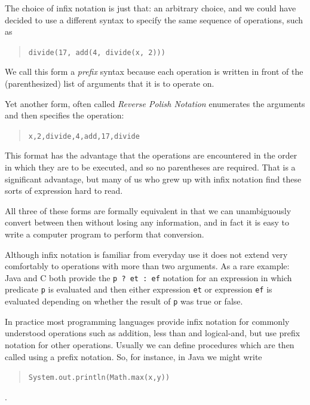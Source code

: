 The choice of infix notation is just that: an arbitrary choice, and we could have decided to use a different syntax to specify the same sequence of operations, such as \begin{quote}\begin{center}
\verb+divide(17, add(4, divide(x, 2)))+
\end{center}
\end{quote} We call this form a {\em prefix} syntax because each operation is written in front of the (parenthesized) list of arguments that it is to operate on.

Yet another form, often called {\em Reverse Polish Notation} enumerates the arguments and then specifies the operation:
\begin{quote}
\begin{center}
\verb+x,2,divide,4,add,17,divide+
\end{center}
\end{quote}

This format has the advantage that the operations are encountered in the order in which they are to be executed, and so no parentheses are required. That is a significant advantage, but many of us who grew up with infix notation find these sorts of expression hard to read.

All three of these forms are formally equivalent in that we can unambiguously convert between then without losing any information, and in fact it is easy to write a computer program to perform that conversion.

Although infix notation is familiar from everyday use it does not extend very comfortably to operations with more than two arguments. As a rare example: Java and C both provide the \verb+p ? et : ef+ notation for an expression in which predicate \verb+p+ is evaluated and then either expression \verb+et+ or expression \verb+ef+ is evaluated depending on whether the result of \verb+p+ was true or false.
 
In practice most programming languages provide infix notation for commonly understood operations such as addition, less than and logical-{\sc and}, but use prefix notation for other operations. Usually we can define procedures which are then called using a prefix notation. So, for instance, in Java we might write \begin{quote}\begin{center}\verb+System.out.println(Math.max(x,y))+\end{center}\end{quote}. 

